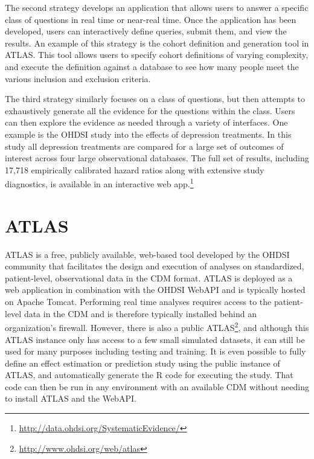 \documentclass[11pt]{book}
\let\rmarkdownfootnote\footnote%
\def\footnote{\protect\rmarkdownfootnote}
\theoremstyle{definition}
\theoremstyle{definition}
\theoremstyle{definition}
\theoremstyle{remark}
\begin{document}
The second strategy develops an application that allows users to answer
a specific class of questions in real time or near-real time. Once the
application has been developed, users can interactively define queries,
submit them, and view the results. An example of this strategy is the
cohort definition and generation tool in ATLAS. This tool allows users
to specify cohort definitions of varying complexity, and execute the
definition against a database to see how many people meet the various
inclusion and exclusion criteria.

The third strategy similarly focuses on a class of questions, but then
attempts to exhaustively generate all the evidence for the questions
within the class. Users can then explore the evidence as needed through
a variety of interfaces. One example is the OHDSI study into the effects
of depression treatments. \citep{schuemie_2018b} In this study all
depression treatments are compared for a large set of outcomes of
interest across four large observational databases. The full set of
results, including 17,718 empirically calibrated hazard ratios along
with extensive study diagnostics, is available in an interactive web
app.\footnote{\url{http://data.ohdsi.org/SystematicEvidence/}}

\section{ATLAS}\label{atlas}

ATLAS is a free, publicly available, web-based tool developed by the
OHDSI community that facilitates the design and execution of analyses on
standardized, patient-level, observational data in the CDM format. ATLAS
is deployed as a web application in combination with the OHDSI WebAPI
and is typically hosted on Apache Tomcat. Performing real time analyses
requires access to the patient-level data in the CDM and is therefore
typically installed behind an organization's firewall. However, there is
also a public ATLAS\footnote{\url{http://www.ohdsi.org/web/atlas}}, and
although this ATLAS instance only has access to a few small simulated
datasets, it can still be used for many purposes including testing and
training. It is even possible to fully define an effect estimation or
prediction study using the public instance of ATLAS, and automatically
generate the R code for executing the study. That code can then be run
in any environment with an available CDM without needing to install
ATLAS and the WebAPI. 
\end{document}
